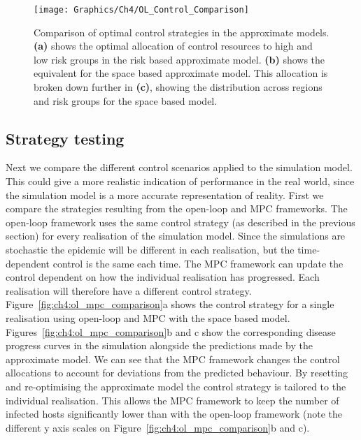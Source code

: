 \begin{figure}[h]
    \begin{center}
        \texttt{[image: Graphics/Ch4/OL\_Control\_Comparison]}
        \caption{Comparison of optimal control strategies in the approximate models. \textbf{(a)} shows the optimal allocation of control resources to high and low risk groups in the risk based approximate model. \textbf{(b)} shows the equivalent for the space based approximate model. This allocation is broken down further in \textbf{(c)}, showing the distribution across regions and risk groups for the space based model.}
        \label{fig:ch4:opt_control_comparison}
    \end{center}
\end{figure}

\subsection{Strategy testing}

Next we compare the different control scenarios applied to the simulation model. This could give a more realistic indication of performance in the real world, since the simulation model is a more accurate representation of reality. First we compare the strategies resulting from the open-loop and MPC frameworks. The open-loop framework uses the same control strategy (as described in the previous section) for every realisation of the simulation model. Since the simulations are stochastic the epidemic will be different in each realisation, but the time-dependent control is the same each time. The MPC framework can update the control dependent on how the individual realisation has progressed. Each realisation will therefore have a different control strategy. Figure~\ref{fig:ch4:ol_mpc_comparison}a shows the control strategy for a single realisation using open-loop and MPC with the space based model. Figures~\ref{fig:ch4:ol_mpc_comparison}b and c show the corresponding disease progress curves in the simulation alongside the predictions made by the approximate model. We can see that the MPC framework changes the control allocations to account for deviations from the predicted behaviour. By resetting and re-optimising the approximate model the control strategy is tailored to the individual realisation. This allows the MPC framework to keep the number of infected hosts significantly lower than with the open-loop framework (note the different y axis scales on Figure~\ref{fig:ch4:ol_mpc_comparison}b and c).

